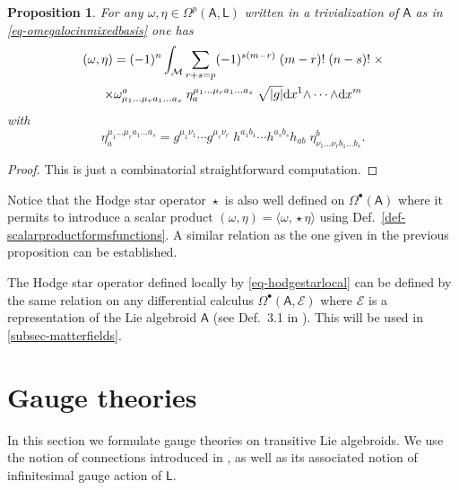 \documentclass[number]{elsarticle}
\newtheorem{proposition}[theorem]{Proposition}
\theoremstyle{definition}
\theoremstyle{remark}
\numberwithin{equation}{section}
\begin{document}
\begin{proposition}
\label{prop-hodgestarcontraction}
For any $\omega, \eta  \in \Omega^p({{{{\mathbf{\mathsf{{A}}}}}}}, {{{{\mathbf{\mathsf{{L}}}}}}})$ written in a trivialization of ${{{{\mathbf{\mathsf{{A}}}}}}}$ as in \eqref{eq-omegalocinmixedbasis} one has
\begin{multline*}
( \omega, \eta ) =  (-1)^n \int_{{{{\mathcal{{M}}}}}} \sum_{r+s=p} (-1)^{s(m-r)}\; (m-r)!\; (n-s)!\; \times
\\
\times\omega^{a}_{\mu_1 \ldots \mu_r a_1 \ldots a_s}\; \eta_{a}^{\mu_1 \ldots \mu_r a_1 \ldots a_s} \; \sqrt{|g|} {\text{\textup{d}}} x^{1} {\mathord{\wedge}} \cdots {\mathord{\wedge}} {\text{\textup{d}}} x^{m} 
\end{multline*}
with
\begin{equation*}
\eta_{a}^{\mu_1 \ldots \mu_r a_1 \ldots a_s} = g^{\mu_1 \nu_1} \cdots g^{\mu_r \nu_r}\; h^{a_1 b_1} \cdots h^{a_s b_s} h_{ab}\; \eta^{b}_{\nu_1 \ldots \nu_r b_1 \ldots b_s}.
\end{equation*}
\end{proposition}

\begin{proof}
This is just a combinatorial straightforward computation.
\end{proof}

Notice that the Hodge star operator ${\mathop{\star}}$ is also well defined on $\Omega^{\bullet}({{{{\mathbf{\mathsf{{A}}}}}}})$ where it permits to introduce a scalar product $( \omega, \eta ) = \langle \omega, {\mathop{\star}} \eta  \rangle$ using Def.~\ref{def-scalarproductformsfunctions}. A similar relation as the one given in the previous proposition can be established.

The Hodge star operator defined locally by \eqref{eq-hodgestarlocal} can be defined by the same relation on any differential calculus $\Omega^{\bullet}({{{{\mathbf{\mathsf{{A}}}}}}}, {{{{\mathcal{{E}}}}}})$ where ${{{{\mathcal{{E}}}}}}$ is a representation of the Lie algebroid ${{{{\mathbf{\mathsf{{A}}}}}}}$ (see Def.~3.1 in \cite{Mass38}). This will be used in \ref{subsec-matterfields}.

\section{Gauge theories}
\label{sec-gaugetheories}

In this section we formulate gauge theories on transitive Lie algebroids. We use the notion of connections introduced in \cite{Mass38}, as well as its associated notion of infinitesimal gauge action of ${{{{\mathbf{\mathsf{{L}}}}}}}$.
\end{document}
